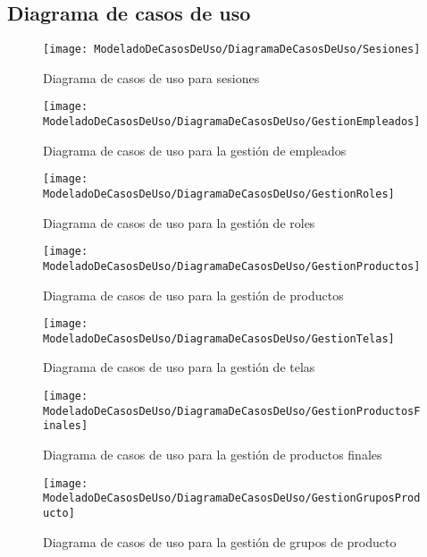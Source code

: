 	\subsection{Diagrama de casos de uso}
	\begin{figure}[H]
		\centering
		\texttt{[image: ModeladoDeCasosDeUso/DiagramaDeCasosDeUso/Sesiones]}
		\caption{Diagrama de casos de uso para sesiones}
	\label{fig:Sesiones}
	\end{figure}
	\begin{figure}[H]
		\centering
		\texttt{[image: ModeladoDeCasosDeUso/DiagramaDeCasosDeUso/GestionEmpleados]}
		\caption{Diagrama de casos de uso para la gestión de empleados}
	\label{fig:GestionEmpleados}
	\end{figure}
	\begin{figure}[H]
		\centering
		\texttt{[image: ModeladoDeCasosDeUso/DiagramaDeCasosDeUso/GestionRoles]}
		\caption{Diagrama de casos de uso para la gestión de roles}
	\label{fig:GestionRoles}
    \end{figure}
    \begin{figure}[H]
		\centering
		\texttt{[image: ModeladoDeCasosDeUso/DiagramaDeCasosDeUso/GestionProductos]}
		\caption{Diagrama de casos de uso para la gestión de productos}
	\label{fig:GestionProductos}
    \end{figure}
    \begin{figure}[H]
		\centering
		\texttt{[image: ModeladoDeCasosDeUso/DiagramaDeCasosDeUso/GestionTelas]}
		\caption{Diagrama de casos de uso para la gestión de telas}
	\label{fig:GestionTelas}
    \end{figure}
    \begin{figure}[H]
		\centering
		\texttt{[image: ModeladoDeCasosDeUso/DiagramaDeCasosDeUso/GestionProductosFinales]}
		\caption{Diagrama de casos de uso para la gestión de productos finales}
	\label{fig:GestionProductosFinales}
    \end{figure}
    \begin{figure}[H]
		\centering
		\texttt{[image: ModeladoDeCasosDeUso/DiagramaDeCasosDeUso/GestionGruposProducto]}
		\caption{Diagrama de casos de uso para la gestión de grupos de producto}
	\label{fig:GestionGruposProducto}
    \end{figure}
